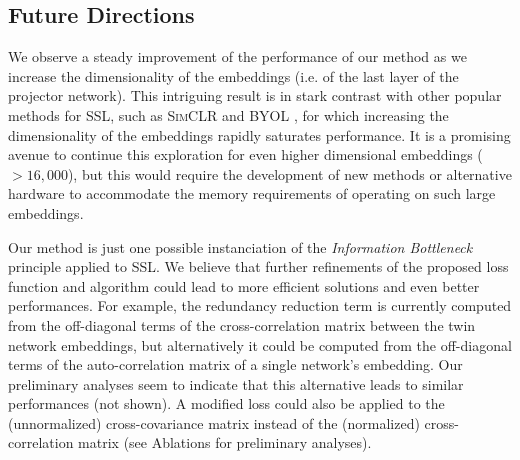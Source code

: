 \subsection{Future Directions}

We observe a steady improvement of the performance of our method as we increase the dimensionality of the embeddings (i.e. of the last layer of the projector network). This intriguing result is in stark contrast with other popular methods for SSL, such as \textsc{SimCLR} \cite{chen2020simple} and \textsc{BYOL} \cite{grill2020bootstrap}, for which increasing the dimensionality of the embeddings rapidly saturates performance. It is a promising avenue to continue this exploration for even higher dimensional embeddings ($>16{,}000$), but this would require the development of new methods or alternative hardware to accommodate the memory requirements of operating on such large embeddings.

Our method is just one possible instanciation of the \emph{Information Bottleneck} principle applied to SSL. We believe that further refinements of the proposed loss function and algorithm could lead to more efficient solutions and even better performances. For example, the redundancy reduction term is currently computed from the off-diagonal terms of the cross-correlation matrix between the twin network embeddings, but alternatively it could be computed from the off-diagonal terms of the auto-correlation matrix of a single network's embedding. Our preliminary analyses seem to indicate that this alternative leads to similar performances (not shown). A modified loss could also be applied to the (unnormalized) cross-covariance matrix instead of the (normalized) cross-correlation matrix (see Ablations for preliminary analyses). 





